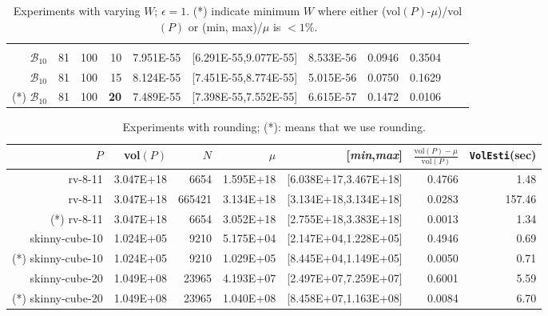 \documentclass[11pt,a4paper]{article}
\def\B{{\mathcal B}} \def\E{{\mathcal E}}
\def\vol{\mbox{vol}}
\def\vol{\mbox{vol}}
\def\Min{{\it min}}
\def\Max{{\it max}}
\begin{document}
\begin{table}[t!]
\begin{tabular*}{\linewidth}{@{\extracolsep{\fill}}rrrrrrrrrrr}
 &  &  &  &  &  &  &  & \\
$\B_{10}$ & 81 & 100 & 10 & 7.951E-55 & [6.291E-55,9.077E-55] & 8.533E-56 & 0.0946 & 0.3504\\
$\B_{10}$ & 81 & 100 & 15 & 8.124E-55 & [7.451E-55,8.774E-55] & 5.015E-56 & 0.0750 & 0.1629\\
(*) $\B_{10}$ & 81 & 100 & {\bf 20} & 7.489E-55 & [7.398E-55,7.552E-55] & 6.615E-57 & 0.1472 & 0.0106\\
\end{tabular*} 
\caption{ Experiments with varying $W$; $\epsilon=1$.  (*) 
indicate minimum $W$ where either (\vol$(P)$-$\mu$)/\vol$(P)$ or
(min, max)/$\mu$ is $<1\%$.  \label{table:walk_len}}
\end{table}

\begin{table}[t]\centering\scriptsize
\begin{tabular*}{\linewidth}{@{\extracolsep{\fill}}rrrrrrr}
$P$ & \vol$(P)$ & $N$ & $\mu$ & [\Min,\Max] & $\frac{\vol(P)-\mu}{\vol(P)}$ & {\tt VolEsti}(sec) 
\\\hline
rv-8-11 & 3.047E+18 & 6654 & 1.595E+18 & [6.038E+17,3.467E+18] & 0.4766 & 1.48\\
rv-8-11 & 3.047E+18 & 665421 & 3.134E+18 & [3.134E+18,3.134E+18] & 0.0283 & 157.46\\
(*) rv-8-11 & 3.047E+18 & 6654 & 3.052E+18 & [2.755E+18,3.383E+18] & 0.0013 & 1.34\\
skinny-cube-10 & 1.024E+05 & 9210 & 5.175E+04 & [2.147E+04,1.228E+05] & 0.4946 & 0.69\\
(*) skinny-cube-10 & 1.024E+05 & 9210 & 1.029E+05 & [8.445E+04,1.149E+05] & 0.0050 & 0.71\\
skinny-cube-20 & 1.049E+08 & 23965 & 4.193E+07 & [2.497E+07,7.259E+07] & 0.6001 & 5.59\\
(*) skinny-cube-20 & 1.049E+08 & 23965 & 1.040E+08 & [8.458E+07,1.163E+08] & 0.0084 & 6.70\\
\end{tabular*} 
\caption{ Experiments with rounding; (*): means that we use rounding.
\label{table:rounding}}
\end{table} 
\end{document}
